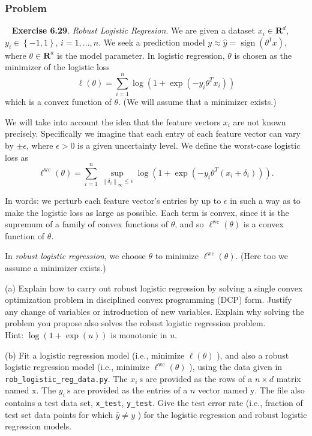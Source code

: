 \documentclass[12pt,reqno]{article}
\theoremstyle{definition}
\numberwithin{equation}{section}
\begin{document}
\subsubsection*{Problem}

~\cite{EE364a-extra} \textbf{Exercise 6.29}. \textit{Robust Logistic Regresion}.
We are given a dataset $x_i \in \mathbf{R}^d$, $y_i \in \left\{ -1, 1 \right\}$, $i = 1, \ldots, n$.
We seek a prediction model $y \approx \hat{y}=\operatorname{sign}\left(\theta^1 x\right)$, where $\theta \in \mathbf{R}^a$ is the model parameter. In logistic regression, $\theta$ is chosen as the minimizer of the logistic loss
\[
\ell(\theta)=\sum_{i=1}^n \log \left(1+\exp \left(-y_i \theta^T x_i\right)\right)
\]
which is a convex function of $\theta$. (We will assume that a minimizer exists.)

\noindent We will take into account the idea that the feature vectors $x_i$ are not known precisely.
Specifically we imagine that each entry of each feature vector can vary by $\pm \epsilon$, where $\epsilon>0$ is a given uncertainty level.
We define the worst-case logistic loss as
\[
\ell^{\mathrm{wc}}(\theta)=\sum_{i=1}^n \sup _{\left\|\delta_i\right\|_{\infty} \leq \epsilon} \log \left(1+\exp \left(-y_i \theta^T\left(x_i+\delta_i\right)\right)\right) .
\]

\noindent In words: we perturb each feature vector's entries by up to $\epsilon$ in such a way as to make the logistic loss as large as possible. Each term is convex, since it is the supremum of a family of convex functions of $\theta$, and so $\ell^{\mathrm{wc}}(\theta)$ is a convex function of $\theta$.

\vspace{0.1cm}
\noindent In \textit{robust logistic regression}, we choose $\theta$ to minimize $\ell^{\mathrm{wc}}(\theta)$.
(Here too we assume a minimizer exists.)

\vspace{0.1cm}
\noindent (a) Explain how to carry out robust logistic regression by solving a single convex optimization problem in disciplined convex programming (DCP) form.
Justify any change of variables or introduction of new variables.
Explain why solving the problem you propose also solves the robust logistic regression problem.\\
\noindent Hint: $\log (1+\exp (u))$ is monotonic in $u$.

\vspace{0.1cm}
\noindent (b) Fit a logistic regression model (i.e., minimize $\ell(\theta)$ ), and also a robust logistic regression model
(i.e., minimize $\ell^{\mathrm{wc}}(\theta)$ ), using the data given in \lstinline|rob_logistic_reg_data.py|.
The $x_i \mathrm{~s}$ are provided as the rows of a $n \times d$ matrix named $\mathrm{x}$.
The $y_i \mathrm{~s}$ are provided as the entries of a $n$ vector named $\mathrm{y}$.
The file also contains a test data set, \lstinline|x_test|, \lstinline|y_test|. Give the test error rate (i.e., fraction of test set data points for which $\hat{y} \neq y$ )
for the logistic regression and robust logistic regression models.
\end{document}
